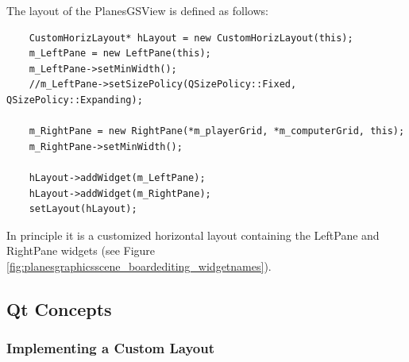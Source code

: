 The layout of the PlanesGSView is defined as follows:

\begin{lstlisting}
	CustomHorizLayout* hLayout = new CustomHorizLayout(this);
	m_LeftPane = new LeftPane(this);
	m_LeftPane->setMinWidth();
	//m_LeftPane->setSizePolicy(QSizePolicy::Fixed, QSizePolicy::Expanding);
	
	m_RightPane = new RightPane(*m_playerGrid, *m_computerGrid, this);
	m_RightPane->setMinWidth();
	
	hLayout->addWidget(m_LeftPane);
	hLayout->addWidget(m_RightPane);
	setLayout(hLayout);
\end{lstlisting} 

In principle it is a customized horizontal layout containing the LeftPane and RightPane widgets (see Figure \ref{fig:planesgraphicsscene_boardediting_widgetnames}). 


\subsection{Qt Concepts}

\subsubsection{Implementing a Custom Layout}

